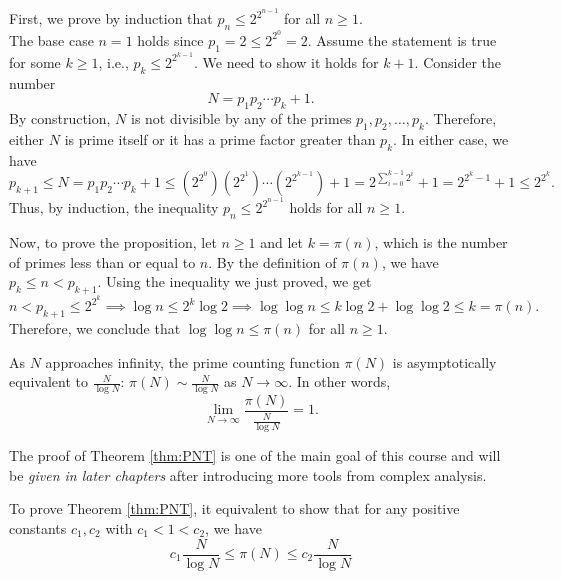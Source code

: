 \documentclass{elegantbook}
\begin{document}
\begin{solution}
  First, we prove by induction that $p_n \leq 2^{2^{n-1}}$ for all $n \geq 1$. \\
  The base case $n=1$ holds since $p_1 = 2 \leq 2^{2^0} = 2$. Assume the statement is true for some $k \geq 1$, i.e., $p_k \leq 2^{2^{k-1}}$. We need to show it holds for $k+1$. Consider the number
  \[
    N = p_1 p_2 \cdots p_k + 1.
  \]
  By construction, $N$ is not divisible by any of the primes $p_1, p_2, \ldots, p_k$. Therefore, either $N$ is prime itself or it has a prime factor greater than $p_k$. In either case, we have
  \[
    p_{k+1} \leq N = p_1 p_2 \cdots p_k + 1 \leq (2^{2^0})(2^{2^1}) \cdots (2^{2^{k-1}}) + 1 = 2^{\sum_{i=0}^{k-1} 2^i} + 1 = 2^{2^k - 1} + 1 \leq 2^{2^k}.
  \]
  Thus, by induction, the inequality $p_n \leq 2^{2^{n-1}}$ holds for all $n \geq 1$.

  Now, to prove the proposition, let $n \geq 1$ and let $k = \pi(n)$, which is the number of primes less than or equal to $n$. By the definition of $\pi(n)$, we have $p_k \leq n < p_{k+1}$. Using the inequality we just proved, we get
  \[
    n < p_{k+1} \leq 2^{2^k} \implies \log n \leq 2^k\log 2 \implies \log \log n \leq k \log 2 + \log \log 2\leq k=\pi(n).
  \]
  Therefore, we conclude that $\log \log n \leq \pi(n)$ for all $n \geq 1$.
\end{solution}

\begin{theorem} \label{thm:PNT}
  As $N$ approaches infinity, the prime counting function $\pi(N)$ is asymptotically equivalent to $\frac{N}{\log N}$: $\pi(N)\sim \frac{N}{\log N}$ as $N \to \infty$. In other words,
  \[
    \lim_{N \to \infty} \frac{\pi(N)}{\frac{N}{\log N}} = 1.
  \]
\end{theorem}

The proof of Theorem \ref{thm:PNT} is one of the main goal of this course and will be \textit{given in later chapters} after introducing more tools from complex analysis.

\begin{lemma}
  To prove Theorem \ref{thm:PNT}, it equivalent to show that for any positive constants $c_1, c_2$ with $c_1 < 1 < c_2$, we have
  \[
    c_1 \frac{N}{\log N} \leq \pi(N) \leq c_2 \frac{N}{\log N}
  \]
\end{lemma}
\end{document}
